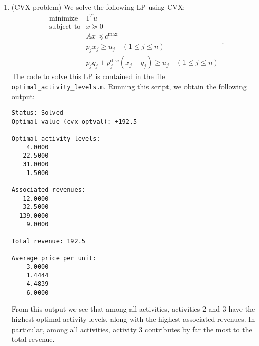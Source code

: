 \documentclass[letterpaper,12pt]{article}
\begin{document}
\begin{enumerate}
\item (CVX problem) We solve the following LP using CVX:
  \begin{equation*}
    \begin{array}{ll}
      \text{minimize} & 1^T u \\
      \text{subject to}
        &x \succeq 0 \\
        &Ax \preceq c^{\text{max}} \\
        &p_j x_j \geq u_j \quad (1 \leq j \leq n) \\
        &p_j q_j + p^{\text{disc}}_j (x_j - q_j) \geq u_j \quad (1 \leq j \leq n)
    \end{array}.
  \end{equation*}
  The code to solve this LP is contained in the file
  \texttt{optimal\_activity\_levels.m}. Running this script, we obtain
  the following output:
  \begin{verbatim}
Status: Solved
Optimal value (cvx_optval): +192.5
 
Optimal activity levels:
    4.0000
   22.5000
   31.0000
    1.5000

Associated revenues:
   12.0000
   32.5000
  139.0000
    9.0000

Total revenue: 192.5

Average price per unit:
    3.0000
    1.4444
    4.4839
    6.0000
  \end{verbatim}
  From this output we see that among all activities, activities 2 and
  3 have the highest optimal activity levels, along with the highest
  associated revenues. In particular, among all activities, activity 3
  contributes by far the most to the total revenue.
\end{enumerate}
\end{document}
